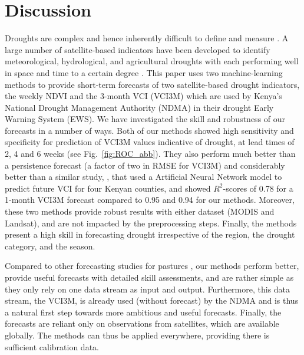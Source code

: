 \documentclass[review]{elsarticle}
\begin{document}
 



\section{Discussion} \label{sec:dis}
Droughts are complex and hence inherently difficult to define and measure \citep{MISHRA2010202}. A large number of satellite-based indicators have been developed to identify meteorological, hydrological, and agricultural droughts \citep{zargar2011review,aghakouchak2015remote} with each performing well in space and time to a certain degree \citep{ZHANG201796}. This paper uses two machine-learning methods to provide short-term forecasts of two satellite-based drought indicators, the weekly NDVI and the 3-month VCI (VCI3M) which are used by Kenya's National Drought Management Authority (NDMA) in their drought Early Warning System (EWS). We have investigated the skill and robustness of our forecasts in a number of ways.
Both of our methods showed high sensitivity and specificity for prediction of VCI3M values indicative of drought, at lead times of 2, 4 and 6 weeks (see Fig.~\ref{fig:ROC_abb}). They also perform much better than a persistence forecast (a factor of two in RMSE for VCI3M) and considerably better than a similar study, \cite{Adede2019}, that used a Artificial Neural Network model to predict future VCI for four Kenyan counties, and showed $R^2$-scores of 0.78 for a 1-month VCI3M forecast compared to 0.95 and 0.94 for our methods.
Moreover, these two methods provide robust results with either dataset (MODIS and Landsat), and are not impacted by the preprocessing steps. 
Finally, the methods present a high skill in forecasting drought irrespective of the region, the drought category, and the season.

Compared to other forecasting studies for pastures \citep{matere2019predictive,Adede2019,Papagiannopoulou,meroni2014early}, our methods perform better, provide useful forecasts with detailed skill assessments, and are rather simple as they only rely on one data stream as input and output. Furthermore, this data stream, the VCI3M, is already used (without forecast) by the NDMA and is thus a natural first step towards more ambitious and useful forecasts. Finally, the forecasts are reliant only on observations from satellites, which are available globally. The methods can thus be applied everywhere, providing there is sufficient calibration data.
\end{document}
